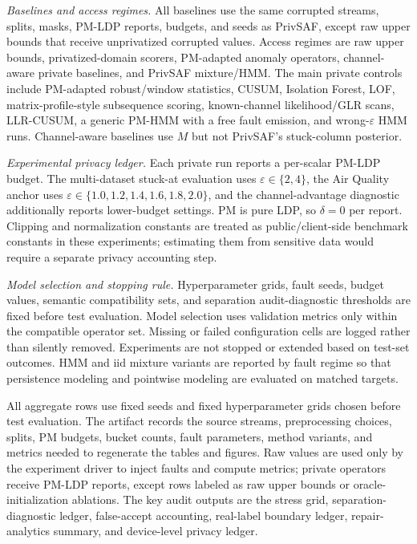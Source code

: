 \documentclass[conference]{IEEEtran}
\begin{document}
\noindent\emph{Baselines and access regimes.}
All baselines use the same corrupted streams, splits, masks, PM-LDP reports, budgets, and seeds as PrivSAF, except raw upper bounds that receive unprivatized corrupted values. Access regimes are raw upper bounds, privatized-domain scorers, PM-adapted anomaly operators, channel-aware private baselines, and PrivSAF mixture/HMM. The main private controls include PM-adapted robust/window statistics, CUSUM, Isolation Forest, LOF, matrix-profile-style subsequence scoring, known-channel likelihood/GLR scans, LLR-CUSUM, a generic PM-HMM with a free fault emission, and wrong-\(\varepsilon\) HMM runs. Channel-aware baselines use \(M\) but not PrivSAF's stuck-column posterior.

\noindent\emph{Experimental privacy ledger.}
Each private run reports a per-scalar PM-LDP budget. The multi-dataset stuck-at evaluation uses \(\varepsilon\in\{2,4\}\), the Air Quality anchor uses \(\varepsilon\in\{1.0,1.2,1.4,1.6,1.8,2.0\}\), and the channel-advantage diagnostic additionally reports lower-budget settings. PM is pure LDP, so \(\delta=0\) per report. Clipping and normalization constants are treated as public/client-side benchmark constants in these experiments; estimating them from sensitive data would require a separate privacy accounting step.

\noindent\emph{Model selection and stopping rule.}
Hyperparameter grids, fault seeds, budget values, semantic compatibility sets, and separation audit-diagnostic thresholds are fixed before test evaluation. Model selection uses validation metrics only within the compatible operator set. Missing or failed configuration cells are logged rather than silently removed. Experiments are not stopped or extended based on test-set outcomes. HMM and iid mixture variants are reported by fault regime so that persistence modeling and pointwise modeling are evaluated on matched targets.

All aggregate rows use fixed seeds and fixed hyperparameter grids chosen before test evaluation. The artifact records the source streams, preprocessing choices, splits, PM budgets, bucket counts, fault parameters, method variants, and metrics needed to regenerate the tables and figures. Raw values are used only by the experiment driver to inject faults and compute metrics; private operators receive PM-LDP reports, except rows labeled as raw upper bounds or oracle-initialization ablations. The key audit outputs are the stress grid, separation-diagnostic ledger, false-accept accounting, real-label boundary ledger, repair-analytics summary, and device-level privacy ledger.
\end{document}
